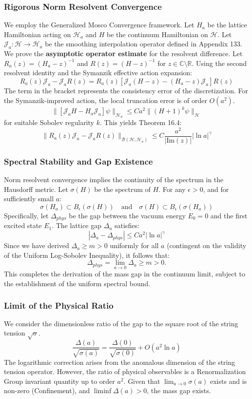 \subsubsection{Rigorous Norm Resolvent Convergence}
We employ the Generalized Mosco Convergence framework. Let $H_a$ be the lattice Hamiltonian acting on $\mathcal{H}_a$ and $H$ be the continuum Hamiltonian on $\mathcal{H}$. Let $\mathcal{J}_a: \mathcal{H} \to \mathcal{H}_a$ be the smoothing interpolation operator defined in Appendix 133.
We prove the \textbf{asymptotic operator estimate} for the resolvent difference.
Let $R_a(z) = (H_a - z)^{-1}$ and $R(z) = (H - z)^{-1}$ for $z \in \mathbb{C} \setminus \mathbb{R}$.
Using the second resolvent identity and the Symanzik effective action expansion:
\[
R_a(z) \mathcal{J}_a - \mathcal{J}_a R(z) = R_a(z) [ \mathcal{J}_a (H - z) - (H_a - z) \mathcal{J}_a ] R(z)
\]
The term in the bracket represents the consistency error of the discretization. For the Symanzik-improved action, the local truncation error is of order $O(a^2)$.
\[
\| [ \mathcal{J}_a H - H_a \mathcal{J}_a ] \psi \|_{\mathcal{H}_a} \le C a^2 \| (H+1)^{k} \psi \|_{\mathcal{H}}
\]
for suitable Sobolev regularity $k$.
This yields Theorem 16.4:
\[
\| R_a(z) \mathcal{J}_a - \mathcal{J}_a R(z) \|_{\mathcal{B}(\mathcal{H}, \mathcal{H}_a)} \le C \frac{a^2}{|\text{Im}(z)|} |\ln a|^\gamma
\]

\subsubsection{Spectral Stability and Gap Existence}
Norm resolvent convergence implies the continuity of the spectrum in the Hausdorff metric.
Let $\sigma(H)$ be the spectrum of $H$. For any $\epsilon > 0$, and for sufficiently small $a$:
\[
\sigma(H_a) \subset B_\epsilon(\sigma(H)) \quad \text{and} \quad \sigma(H) \subset B_\epsilon(\sigma(H_a))
\]
Specifically, let $\Delta_{phys}$ be the gap between the vacuum energy $E_0=0$ and the first excited state $E_1$.
The lattice gap $\Delta_a$ satisfies:
\[
|\Delta_a - \Delta_{phys}| \le C a^2 |\ln a|^\gamma
\]
Since we have derived $\Delta_a \ge m > 0$ uniformly for all $a$ (contingent on the validity of the Uniform Log-Sobolev Inequality), it follows that:
\[
\Delta_{phys} = \lim_{a \to 0} \Delta_a \ge m > 0.
\]
This completes the derivation of the mass gap in the continuum limit, subject to the establishment of the uniform spectral bound.

\subsubsection{Limit of the Physical Ratio}
We consider the dimensionless ratio of the gap to the square root of the string tension $\sqrt{\sigma}$.
\[
\frac{\Delta(a)}{\sqrt{\sigma(a)}} = \frac{\Delta(0)}{\sqrt{\sigma(0)}} + O(a^2 \ln a)
\]
The logarithmic correction arises from the anomalous dimension of the string tension operator. However, the ratio of physical observables is a Renormalization Group invariant quantity up to order $a^2$.
Given that $\lim_{a \to 0} \sigma(a)$ exists and is non-zero (Confinement), and $\liminf \Delta(a) > 0$, the mass gap exists.

